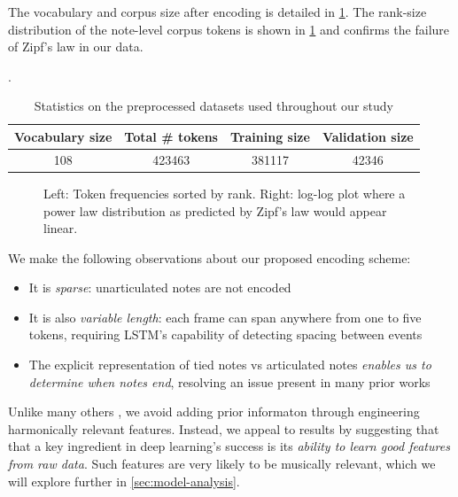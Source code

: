 The vocabulary and corpus size after encoding is detailed in
\cref{tab:encoded-corpus-stats}. The rank-size distribution of the note-level
corpus tokens is shown in \cref{fig:zipf} and confirms the failure of Zipf's
law in our data.

\begin{table}[tb]
  \centering
  \caption{Statistics on the preprocessed datasets used throughout our study}
  \label{tab:encoded-corpus-stats}.
  \begin{tabular}{c c c c}
    \toprule
    Vocabulary size & Total \# tokens & Training size & Validation size \\
    \midrule
    108 & 423463 & 381117 & 42346 \\
    \bottomrule
  \end{tabular}
\end{table}

\begin{figure}[tb]
  \centering
  
  \caption{Left: Token frequencies sorted by rank. Right: log-log plot where
  a power law distribution as predicted by Zipf's law would appear linear.}
  \label{fig:zipf}
\end{figure}

We make the following observations about our proposed encoding scheme:
\begin{itemize}
  \item It is \emph{sparse}: unarticulated notes are not encoded
  \item It is also \emph{variable length}: each frame can span anywhere from one to five tokens, requiring
    LSTM's capability of detecting spacing between events\citep{gers2002learning}
  \item The explicit representation of tied notes vs articulated notes \emph{enables us to
    determine when notes end}, resolving an issue present in many prior works
    \citep{Eck2002,eck2008learning,Liu2014,Brien2016}
\end{itemize}

Unlike many others
\citep{mozer1994neural,franklin2004recurrent,laden1989representation}, we avoid
adding prior informaton through engineering harmonically relevant features.
Instead, we appeal to results by \citet{bengio2009learning,Bengio2011}
suggesting that that a key ingredient in deep learning's success is its \emph{ability
to learn good features from raw data}. Such features are very likely to be
musically relevant, which we will explore further in \cref{sec:model-analysis}.

